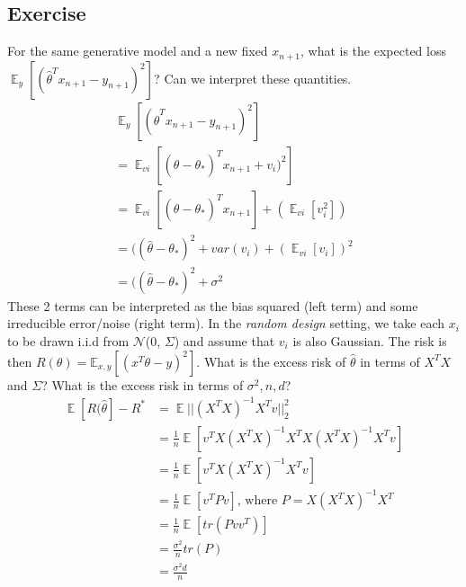 \subsection{Exercise}\label{sec:exercise}
For the same generative model and a new fixed $x_{n+1}$, what is the expected loss $\mathop{{}\mathbb{E}}_{y}[(\hat{\theta}^{T}x_{n+1} - y_{n+1})^{2}]$? Can we interpret these quantities.
\begin{align*} 
\mathop{{}\mathbb{E}}_{y}[(\hat{\theta}^{T}x_{n+1} - y_{n+1})^{2}] \\
= \mathop{{}\mathbb{E}}_{vi}[(\hat{\theta} - \theta_{*})^{T}x_{n+1} + v_{i})^{2}] \\ 
= \mathop{{}\mathbb{E}}_{vi}[(\hat{\theta} - \theta_{*})^{T}x_{n+1}] + (\mathop{{}\mathbb{E}}_{vi}[v_{i}^{2}]) \\ 
= ((\hat{\theta} - \theta_{*})^{2} + var(v_{i}) + (\mathop{{}\mathbb{E}}_{vi}[v_{i}])^{2} \\ 
= ((\hat{\theta} - \theta_{*})^{2} + \sigma^{2}
\end{align*}
These 2 terms can be interpreted as the bias squared (left term) and some irreducible error/noise (right term).
\smallbreak
In the \textit{random design} setting, we take each $x_{i}$ to be drawn i.i.d from $\mathcal{N}$($0$, $\Sigma$) and assume that $v_{i}$ is also Gaussian. The risk is then $R(\theta) = \mathbb{E}_{x,y}[(x^{T}\theta - y)^{2}]$. What is the excess risk of $\hat{\theta}$ in terms of $X^{T}X$ and $\Sigma$? What is the excess risk in terms of $\sigma^{2}, n, d$?
\begin{align*} 
\mathop{{}\mathbb{E}}[R(\hat{\theta}] - R^{*} &= \mathop{{}\mathbb{E}}||(X^{T}X)^{-1}X^{T}v||_{2}^{2} \\
&= \frac{1}{n}\mathop{{}\mathbb{E}}[v^{T}X(X^{T}X)^{-1}X^{T}X(X^{T}X)^{-1}X^{T}v] \\
&= \frac{1}{n}\mathop{{}\mathbb{E}}[v^{T}X(X^{T}X)^{-1}X^{T}v] \\ 
&= \frac{1}{n}\mathop{{}\mathbb{E}}[v^{T}Pv] \text{, where } P = X(X^{T}X)^{-1}X^{T} \\
&= \frac{1}{n}\mathop{{}\mathbb{E}}[tr(Pvv^{T})] \\
&= \frac{\sigma^{2}}{n}tr(P) \\
&= \frac{\sigma^{2}d}{n}
\end{align*}


